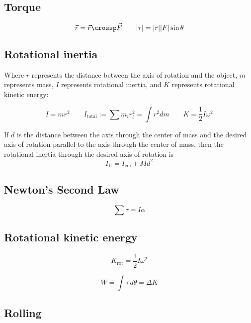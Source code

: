\subsection{Torque}

\[
	\vec{\tau} = \vec{r} \crossp \vec{F} \qquad |\tau| = |r| |F| \sin \theta
\]

\subsection{Rotational inertia}

Where $r$ represents the distance between the axis of rotation and the object, $m$ represents mass, $I$ represents rotational inertia, and $K$ represents rotational kinetic energy:

\[
	I = mr^2 \qquad I_\text{total} := \sum m_i r_i^2 = \int r^2 dm \qquad K = \frac{1}{2} I \omega^2
\]

\begin{namedtheorem}
	If $d$ is the distance between the axis through the center of mass and the desired axis of rotation parallel to the axis through the center of mass, then the rotational inertia through the desired axis of rotation is
	\[
		I_{\text{II}} = I_{\text{cm}} + Md^2
	\]
\end{namedtheorem}

\subsection{Newton's Second Law}

\[
	\sum \tau = I \alpha
\]

\subsection{Rotational kinetic energy}

\begin{definition}
	\[
		K_{\text{rot}} = \frac{1}{2} I \omega^2
	\]
\end{definition}

\begin{definition}
	\[
		W = \int \tau \,d\theta = \Delta K
	\]
\end{definition}

\subsection{Rolling}

